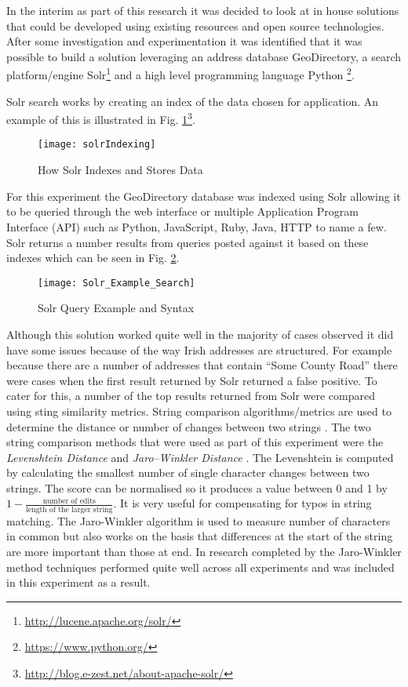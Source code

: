 In the interim as part of this research it was decided to look at in house solutions that could be developed using existing resources and open source technologies. After some investigation and experimentation it was identified that it was possible to build a solution leveraging an address database GeoDirectory, a search platform/engine Solr\footnote{\url{http://lucene.apache.org/solr/}} and a high level programming language Python \footnote{\url{https://www.python.org/}}.


Solr search works by creating an index of the data chosen for application. An example of this is illustrated in Fig. \ref{fig:solrIndexing}\footnote{\url{http://blog.e-zest.net/about-apache-solr/}}. 

\begin{figure}[H]
	\texttt{[image: solrIndexing]}
	\caption[Illustration of Inverted Indexing]
	{How Solr Indexes and Stores Data}
	\label{fig:solrIndexing}
\end{figure}

For this experiment the GeoDirectory database was indexed using Solr allowing it to be queried through the web interface or multiple Application Program Interface (API) such as Python, JavaScript, Ruby, Java, HTTP to name a few. Solr returns a number results from queries posted against it based on these indexes which can be seen in Fig. \ref{fig:Solr_Example_Search from Web Interface}.

\begin{figure}[H]
	\texttt{[image: Solr\_Example\_Search]}
	\caption{Solr Query Example and Syntax}
	\label{fig:Solr_Example_Search from Web Interface}
\end{figure}

Although this solution worked quite well in the majority of cases observed it did have some issues because of the way Irish addresses are structured. For example because there are a number of addresses that contain ``Some County Road'' there were cases when the first result returned by Solr returned a false positive. To cater for this, a number of the top results returned from Solr were compared using sting similarity metrics. String comparison algorithms/metrics are used to determine the distance or number of changes between two strings \citep{wagner_string--string_1974}. The two string comparison methods that were used as part of this experiment were the \textit{Levenshtein Distance} \citep{levenshtein_binary_1966} and \textit{Jaro–Winkler Distance} \citep{winkler_string_1990}. The Levenshtein is computed by calculating the smallest number of single character changes between two strings. The score can be normalised so it produces a value between 0 and 1 by $1 -\frac{\text{number of edits}}{\text{length of the larger string}}$. It is very useful for compensating for typos in string matching. The Jaro-Winkler algorithm is used to measure number of characters in common but also works on the basis that differences at the start of the string are more important than those at end. In research completed by \cite{christen_comparison_2006} the Jaro-Winkler method techniques performed quite well across all experiments and was included in this experiment as a result. 

